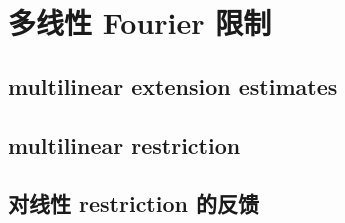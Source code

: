 \section{多线性 Fourier 限制}
\label{b2:sec:2504}


\subsection{multilinear extension estimates}
\label{b2:subsec:250401}

\subsection{multilinear restriction}
\label{b2:subsec:250402}

\subsection{对线性 restriction 的反馈}
\label{b2:subsec:250403}


